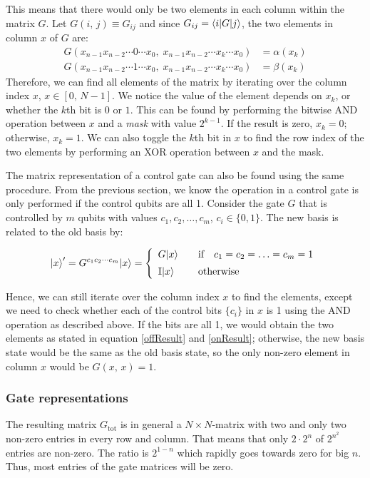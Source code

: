 \documentclass[bibliography=totocnumbered, 10pt]{article}
\theoremstyle{NoticeStyle}
\begin{document}
This means that there would only be two elements in each column within the matrix $G$. Let $G(i,\,j) \equiv G_{ij}$ and since $G_{ij} = {\left\langle{i}\right\vert} G {\left\vert{j}\right\rangle}$, the two elements in column $x$ of $G$ are:
\begin{align}
	G(x_{n-1}x_{n-2}\dotsm0\dotsm x_0,\;x_{n-1}x_{n-2}\dotsm x_k\dotsm x_0) &= \alpha(x_k)\label{offResult}\\ 
	G(x_{n-1}x_{n-2}\dotsm1\dotsm x_0,\;x_{n-1}x_{n-2}\dotsm x_k\dotsm x_0) &= \beta(x_k) \label{onResult}
\end{align}
Therefore, we can find all elements of the matrix by iterating over the column index $x$, $x \in [0,\,N-1]$. We notice the value of the element depends on $x_k$, or whether the $k$th bit is $0$ or $1$. This can be found by performing the bitwise AND operation between $x$ and a \emph{mask} with value $2^{k-1}$. If the result is zero, $x_k = 0$; otherwise, $x_k = 1$. We can also toggle the $k$th bit in $x$ to find the row index of the two elements by performing an XOR operation between $x$ and the mask.

The matrix representation of a control gate can also be found using the same procedure. From the previous section, we know the operation in a control gate is only performed if the control qubits are all 1. Consider the gate $G$ that is controlled by $m$ qubits with values $c_1, c_2, \dotsc, c_m$, $c_i \in \{0, 1\}$. The new basis is related to the old basis by:

\begin{align}
	{\left\vert{x}\right\rangle}' = G^{c_1c_2\dotsm c_m} {\left\vert{x}\right\rangle} = \left\{ 
	\begin{array}{ll}
		G{\left\vert{x}\right\rangle}  &  \quad\textrm{if}\quad c_1 = c_2 = \dotsc = c_m = 1\\[5pt]
		\mathbb{I}{\left\vert{x}\right\rangle} & \quad \textrm{otherwise}
	\end{array}
	\right.
\end{align}

Hence, we can still iterate over the column index $x$ to find the elements, except we need to check whether each of the control bits $\{c_i\}$ in $x$ is 1 using the AND operation as described above. If the bits are all 1, we would obtain the two elements as stated in equation \ref{offResult} and \ref{onResult}; otherwise, the new basis state would be the same as the old basis state, so the only non-zero element in column $x$ would be $G(x,\,x) = 1$.

\subsubsection{Gate representations}
The resulting matrix $G_\text{tot}$ is in general a $N \times N$-matrix with two and only two non-zero entries in every row and column. That means that only $2\cdot 2^n$ of $2^{n^2}$ entries are non-zero. The ratio is $2^{1-n}$ which rapidly goes towards zero for big $n$. Thus, most entries of the gate matrices will be zero.
\end{document}
